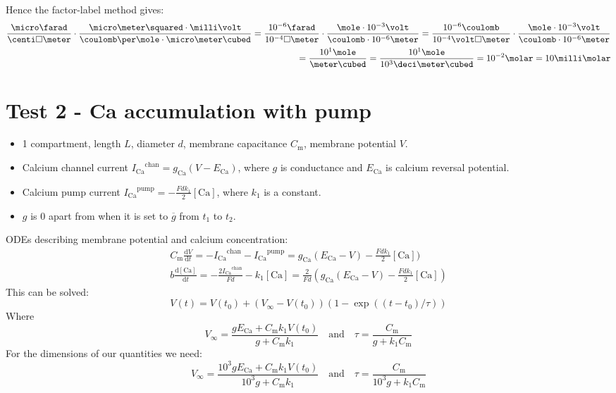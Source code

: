 \documentclass{article}
\newcommand{\ICa}{\ensuremath{I_\mathrm{Ca}}\xspace}
\newcommand{\gCa}{\ensuremath{g_\mathrm{Ca}}\xspace}
\newcommand{\ECa}{\ensuremath{E_\mathrm{Ca}}\xspace}
\newcommand{\Cmem}{\ensuremath{C_\mathrm{m}}\xspace}
\newcommand{\dif}{\textrm{d}}
\newcommand{\cCa}{[\textrm{Ca}]}
\begin{document}
Hence the factor-label method gives: 
\begin{equation}
  \begin{split}
  \frac{\micro\farad}{\centi\square\meter}\cdot\frac{\micro\meter\squared\cdot\milli\volt}%
  {\coulomb\per\mole\cdot\micro\meter\cubed}
  = \frac{10^{-6} \farad}{10^{-4}\square\meter}\cdot\frac{\mole\cdot10^{-3}\volt}%
  {\coulomb\cdot10^{-6}\meter}
  = \frac{10^{-6} \coulomb}{10^{-4}\volt\square\meter}\cdot\frac{\mole\cdot10^{-3}\volt}%
  {\coulomb\cdot10^{-6}\meter}\\
  = \frac{10^1\mole}{\meter\cubed} =
  \frac{10^1\mole}{10^3\deci\meter\cubed} = 10^{-2}\molar = 10\milli\molar
  \end{split}
\end{equation}
  
\clearpage
\section{Test 2  - Ca accumulation with pump}
\label{tests:sec:test-1-ca}

\begin{itemize}
\item 1 compartment, length $L$, diameter $d$, membrane capacitance
  \Cmem, membrane potential $V$.
\item Calcium channel current $\ICa^\mathrm{chan}=\gCa(V-\ECa)$, where $g$ is conductance
  and $\ECa$ is calcium reversal potential.
\item Calcium pump current $\ICa^\mathrm{pump}=- \frac{Fdk_1}{2}\cCa$,
  where $k_1$ is a constant.
\item $g$ is 0 apart from when it is set to $\overline{g}$ from $t_1$
  to $t_2$.
\end{itemize}

ODEs describing membrane potential and calcium concentration:
\begin{equation}
  \begin{split}
    \Cmem\frac{\dif V}{\dif t} = -\ICa^\mathrm{chan} - \ICa^\mathrm{pump} = \gCa(\ECa - V) - \frac{Fdk_1}{2}\cCa ) \\
b    \frac{\dif\cCa}{\dif t} = -\frac{2\ICa^\mathrm{chan}}{Fd} - k_1\cCa =
    \frac{2}{Fd} \left(\gCa(\ECa - V) - \frac{Fdk_1}{2}\cCa \right)
  \end{split}
\end{equation}
 This can be solved:
\begin{equation}
  \label{tests:eq:2}
  V(t) = V(t_0) + (V_\infty - V(t_0))(1-\exp((t-t_0)/\tau))
\end{equation}
Where 
\begin{equation}
  \label{tests:eq:5}
  V_\infty = \frac{g\ECa + \Cmem k_1 V(t_0)}{g + \Cmem k_1} \quad
  \mbox{and} \quad \tau = \frac{\Cmem}{g + k_1\Cmem}
\end{equation}
For the dimensions of our quantities we need:
\begin{equation}
  \label{tests:eq:5}
  V_\infty = \frac{10^3g\ECa + \Cmem k_1 V(t_0)}{10^3g + \Cmem k_1} \quad
  \mbox{and} \quad \tau = \frac{\Cmem}{10^3g + k_1\Cmem}
\end{equation}
\end{document}
